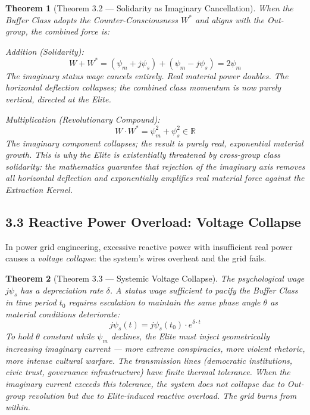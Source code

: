 \documentclass[12pt]{book}
\numberwithin{equation}{chapter}
\newtheorem{theorem}{Theorem}[chapter]
\begin{document}
\begin{theorem}[Theorem 3.2 — Solidarity as Imaginary Cancellation]
When the Buffer Class adopts the Counter-Consciousness $W^*$ and aligns with the Out-group, the combined force is:
    \
\

\emph{Addition (Solidarity):}
      \[ W + W^* = (\psi_m + j\psi_s) + (\psi_m - j\psi_s) = 2\psi_m \]
    The imaginary status wage cancels entirely. Real material power doubles. The horizontal deflection collapses; the combined class momentum is now purely vertical, directed at the Elite.
    \
\

\emph{Multiplication (Revolutionary Compound):}
    \[
      W \cdot W^* = \psi_m^2 + \psi_s^2 \in \mathbb{R}
    \]
    The imaginary component collapses; the result is purely real, exponential material growth. This is why the Elite is existentially threatened by cross-group class solidarity: the mathematics guarantee that rejection of the imaginary axis removes all horizontal deflection and exponentially amplifies real material force against the Extraction Kernel.
  \end{theorem}

\subsection{3.3 Reactive Power Overload: Voltage Collapse}

    In power grid engineering, excessive reactive power with insufficient real power causes a \emph{voltage collapse}: the system's wires overheat and the grid fails.
  

\begin{theorem}[Theorem 3.3 — Systemic Voltage Collapse]
The psychological wage $j\psi_s$ has a depreciation rate $\delta$. A status wage sufficient to pacify the Buffer Class in time period $t_0$ requires escalation to maintain the same phase angle $\theta$ as material conditions deteriorate:
      \[ j\psi_s(t) = j\psi_s(t_0) \cdot e^{\delta \cdot t} \]
    To hold $\theta$ constant while $\psi_m$ declines, the Elite must inject geometrically increasing imaginary current — more extreme conspiracies, more violent rhetoric, more intense cultural warfare. The transmission lines (democratic institutions, civic trust, governance infrastructure) have finite thermal tolerance. When the imaginary current exceeds this tolerance, the system does not collapse due to Out-group revolution but due to Elite-induced reactive overload. The grid burns from within.
  \end{theorem}
\end{document}
